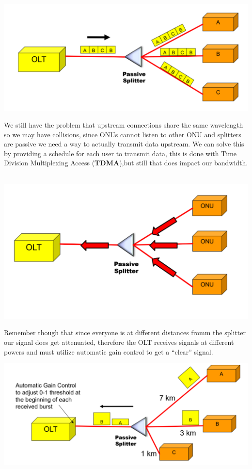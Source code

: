 \documentclass[11pt, a4paper]{article}
\begin{document}
\begin{center}
    \includegraphics[scale=0.5]{img/AccessNetworks/PON/downstream.png}
\end{center}
We still have the problem that upstream connections share the same wavelength so we may have collisions, since ONUs cannot listen to other ONU and splitters are passive we need a way to actually transmit data upstream. We can solve this by providing a schedule for each user to transmit data, this is done with Time Division Multiplexing Access (\textbf{TDMA}),but still that does impact our bandwidth.\\\\
\begin{center}
    \includegraphics[scale=0.5]{img/AccessNetworks/PON/upstream.png}
\end{center}
Remember though that since everyone is at different distances fromm the splitter our signal does get attenuated, therefore the OLT receives signals at different powers and must utilize automatic gain control to get a “clear” signal.
\begin{center}
    \includegraphics[scale=0.5]{img/AccessNetworks/PON/AGC.png}
\end{center}
\end{document}
